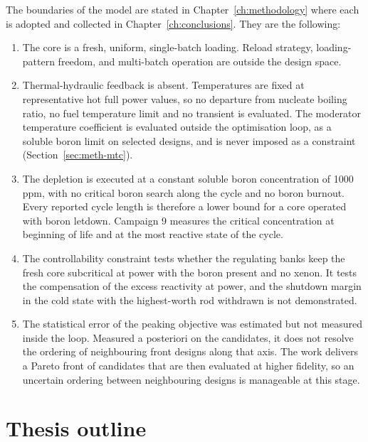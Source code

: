 The boundaries of the model are stated in Chapter~\ref{ch:methodology}
where each is adopted and collected in Chapter~\ref{ch:conclusions}.
They are the following:

\begin{enumerate}
  \item The core is a fresh, uniform, single-batch loading. Reload
        strategy, loading-pattern freedom, and multi-batch operation are
        outside the design space.

  \item Thermal-hydraulic feedback is absent. Temperatures are fixed at
        representative hot full power values, so no departure from
        nucleate boiling ratio, no fuel temperature limit and no
        transient is evaluated. The moderator temperature coefficient
        is evaluated outside the optimisation loop, as a soluble boron
        limit on selected designs, and is never imposed as a
        constraint (Section~\ref{sec:meth-mtc}).

  \item The depletion is executed at a constant soluble boron concentration of
        1000\,ppm, with no critical boron search along the cycle and no
        boron burnout. Every reported cycle length is therefore a lower
        bound for a core operated with boron letdown. Campaign 9
        measures the critical concentration at beginning of life and at
        the most reactive state of the cycle.

  \item The controllability constraint tests whether the regulating banks
        keep the fresh core subcritical at power with the boron present
        and no xenon. It tests the compensation of the excess reactivity
        at power, and the shutdown margin
        in the cold state with the highest-worth rod withdrawn is not
        demonstrated.

  \item The statistical error of the peaking objective was estimated but
        not measured inside the loop. Measured a posteriori on the
        candidates, it does not resolve the ordering of neighbouring
        front designs along that axis. The work delivers a Pareto front
        of candidates that are then evaluated at higher fidelity, so an
        uncertain ordering between neighbouring designs is manageable at
        this stage.
\end{enumerate}

\section{Thesis outline}
\label{sec:intro-outline}

